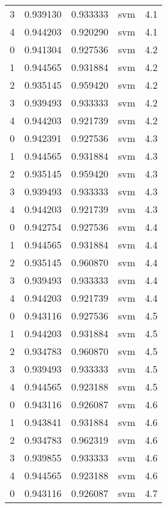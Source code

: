 \begin{tabular}{rrrlr}
     3 & 0.939130 & 0.933333 &      svm &        4.1 \\
     4 & 0.944203 & 0.920290 &      svm &        4.1 \\
     0 & 0.941304 & 0.927536 &      svm &        4.2 \\
     1 & 0.944565 & 0.931884 &      svm &        4.2 \\
     2 & 0.935145 & 0.959420 &      svm &        4.2 \\
     3 & 0.939493 & 0.933333 &      svm &        4.2 \\
     4 & 0.944203 & 0.921739 &      svm &        4.2 \\
     0 & 0.942391 & 0.927536 &      svm &        4.3 \\
     1 & 0.944565 & 0.931884 &      svm &        4.3 \\
     2 & 0.935145 & 0.959420 &      svm &        4.3 \\
     3 & 0.939493 & 0.933333 &      svm &        4.3 \\
     4 & 0.944203 & 0.921739 &      svm &        4.3 \\
     0 & 0.942754 & 0.927536 &      svm &        4.4 \\
     1 & 0.944565 & 0.931884 &      svm &        4.4 \\
     2 & 0.935145 & 0.960870 &      svm &        4.4 \\
     3 & 0.939493 & 0.933333 &      svm &        4.4 \\
     4 & 0.944203 & 0.921739 &      svm &        4.4 \\
     0 & 0.943116 & 0.927536 &      svm &        4.5 \\
     1 & 0.944203 & 0.931884 &      svm &        4.5 \\
     2 & 0.934783 & 0.960870 &      svm &        4.5 \\
     3 & 0.939493 & 0.933333 &      svm &        4.5 \\
     4 & 0.944565 & 0.923188 &      svm &        4.5 \\
     0 & 0.943116 & 0.926087 &      svm &        4.6 \\
     1 & 0.943841 & 0.931884 &      svm &        4.6 \\
     2 & 0.934783 & 0.962319 &      svm &        4.6 \\
     3 & 0.939855 & 0.933333 &      svm &        4.6 \\
     4 & 0.944565 & 0.923188 &      svm &        4.6 \\
     0 & 0.943116 & 0.926087 &      svm &        4.7 \\

\end{tabular}
